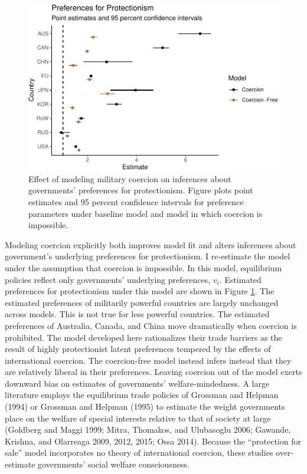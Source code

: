 \documentclass{puthesis}
\begin{document}
\begin{figure}
\centering
\includegraphics{figure/ests_mil_off-1.pdf}
\caption{Effect of modeling military coercion on inferences about
governments' preferences for protectionism. Figure plots point estimates
and 95 percent confidence intervals for preference parameters under
baseline model and model in which coercion is impossible.
\label{fig:ests_mil_off}}
\end{figure}

Modeling coercion explicitly both improves model fit and alters
inferences about government's underlying preferences for protectionism.
I re-estimate the model under the assumption that coercion is
impossible. In this model, equilibrium policies reflect only
governments' underlying preferences, \(v_i\). Estimated preferences for
protectionism under this model are shown in Figure
\ref{fig:ests_mil_off}. The estimated preferences of militarily powerful
countries are largely unchanged across models. This is not true for less
powerful countries. The estimated preferences of Australia, Canada, and
China move dramatically when coercion is prohibited. The model developed
here rationalizes their trade barriers as the result of highly
protectionist latent preferences tempered by the effects of
international coercion. The coercion-free model instead infers instead
that they are relatively liberal in their preferences. Leaving coercion
out of the model exerts downward bias on estimates of governments'
welfare-mindedness. A large literature employs the equilibrium trade
policies of Grossman and Helpman (1994) or Grossman and Helpman (1995)
to estimate the weight governments place on the welfare of special
interests relative to that of society at large (Goldberg and Maggi 1999;
Mitra, Thomakos, and Ulubasoglu 2006; Gawande, Krishna, and Olarreaga
2009, 2012, 2015; Ossa 2014). Because the ``protection for sale'' model
incorporates no theory of international coercion, these studies
over-estimate governments' social welfare consciousness.
\end{document}
